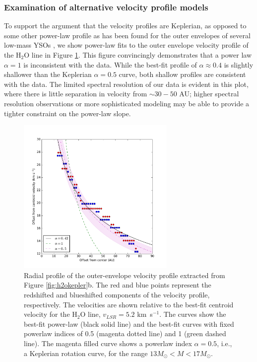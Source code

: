\documentclass[twocolumn]{aastex61}
\newcommand{\msun}{\ensuremath{M_{\odot}}\xspace}			%
\newcommand{\water}{H$_{2}$O\xspace}		%
\newcommand{\kms}{\textrm{km~s}\ensuremath{^{-1}}\xspace}	%
\begin{document}
\subsubsection{Examination of alternative velocity profile models}
To support the argument that the velocity profiles are Keplerian, as opposed to
some other power-law profile as has been found for the outer envelopes of
several low-mass YSOs
\citep{Lee2017h,Aso2017b,Ohashi2014a,Lindberg2014a,Murillo2013a}, we show
power-law fits to the outer envelope velocity profile of the \water line
in Figure \ref{fig:h2opowerlaws}.
This figure convincingly demonstrates that
a power law $\alpha=1$ \citep[e.g., as observed in the outer parts of low-mass
YSO disks;][]{Aso2017b} is inconsistent with the data.  While the best-fit
profile of $\alpha\approx0.4$ is slightly shallower than the Keplerian
$\alpha=0.5$ curve, both shallow profiles are consistent with the data.
The limited spectral resolution of our data is evident in this plot, where
there is little separation in velocity from $\sim30-50$ AU; higher
spectral resolution observations or more sophisticated modeling may be able to
provide a tighter constraint on the power-law slope.



\begin{figure}[!htp]
\includegraphics[scale=1,width=3.0in]{figures/bestfit_powerlaw_H2O_kepler_SeifriedPlot_0.01arcsec.pdf}
\caption{Radial profile of the outer-envelope velocity profile extracted from
Figure \ref{fig:h2okepler}b.  The red and blue points represent the redshifted
and blueshifted components of the velocity profile, respectively.  The velocities
are shown relative to the best-fit centroid velocity for the \water line,
$v_{LSR}=5.2$ \kms.  The curves show the best-fit power-law (black solid line)
and the best-fit curves with fixed powerlaw indices of 0.5 (magenta dotted line)
and 1 (green dashed line).  The magenta filled curve shows a powerlaw index
$\alpha=0.5$, i.e., a Keplerian rotation curve, for the range $13 \msun < M <
17 \msun$. }
\label{fig:h2opowerlaws}
\end{figure}
\end{document}
